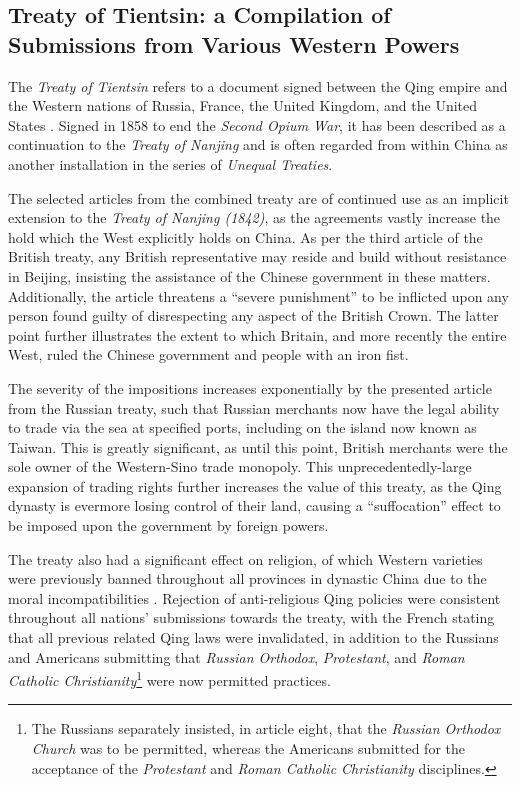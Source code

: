\documentclass{article}
\begin{document}
\subsection{Treaty of Tientsin: a Compilation of Submissions from Various Western Powers}

The \textit{Treaty of Tientsin} refers to a document signed between the Qing empire and the Western nations of Russia, France, the United Kingdom, and the United States
\autocite{Nield:2015}. Signed in 1858 to end the \textit{Second Opium War}, it has been described as a continuation to the \textit{Treaty of Nanjing}
\autocite{Wang:2008} and is often regarded from within China as another installation in the series of \textit{Unequal Treaties}.


The selected articles from the combined treaty are of continued use as an implicit extension to the \textit{Treaty of Nanjing (1842)}, as the agreements vastly increase the hold which the West explicitly holds on China. As per the third article of the British treaty, any British representative may reside and build without resistance in Beijing, insisting the assistance of the Chinese government in these matters. Additionally, the article threatens a ``severe punishment'' to be inflicted upon any person found guilty of disrespecting any aspect of the British Crown. The latter point further illustrates the extent to which Britain, and more recently the entire West, ruled the Chinese government and people with an iron fist.

The severity of the impositions increases exponentially by the presented article from the Russian treaty, such that Russian merchants now have the legal ability to trade via the sea at specified ports, including on the island now known as Taiwan. This is greatly significant, as until this point, British merchants were the sole owner of the Western-Sino trade monopoly. This unprecedentedly-large expansion of trading rights further increases the value of this treaty, as the Qing dynasty is evermore losing control of their land, causing a ``suffocation'' effect to be imposed upon the government by foreign powers.

The treaty also had a significant effect on religion, of which Western varieties were previously banned throughout all provinces in dynastic China due to the moral incompatibilities
\autocite{Goossaert:2006}. Rejection of anti-religious Qing policies were consistent throughout all nations' submissions towards the treaty, with the French stating that all previous related Qing laws were invalidated, in addition to the Russians and Americans
\autocite{Bevans:1968} submitting that \textit{Russian Orthodox}, \textit{Protestant}, and \textit{Roman Catholic Christianity}\footnote{The Russians separately insisted, in article eight, that the \textit{Russian Orthodox Church} was to be permitted, whereas the Americans submitted for the acceptance of the \textit{Protestant} and \textit{Roman Catholic Christianity} disciplines.} were now permitted practices.
\end{document}
